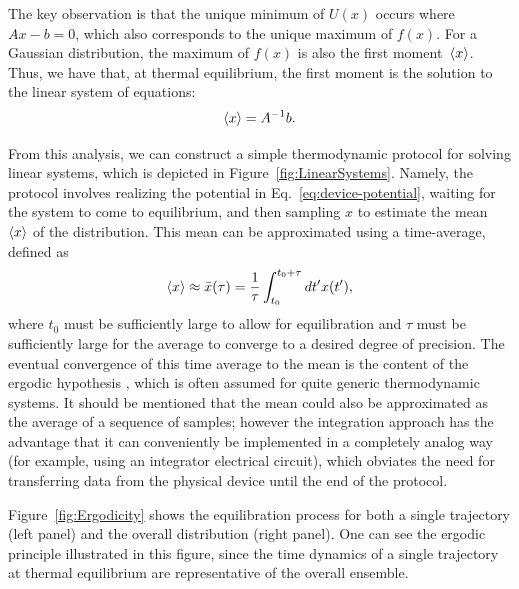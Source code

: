 \documentclass[prx,onecolumn,floatfix,longbibliography,notitlepage, nofootinbib,12pt]{revtex4-2}
\begin{document}
The key observation is that the unique minimum of $U(x)$ occurs where $Ax-b = 0$, which also corresponds to the unique maximum of $f(x)$. For a Gaussian distribution, the maximum of $f(x)$ is also the first moment~$\braket{x}$. Thus, we have that, at thermal equilibrium, the first moment is the solution to the linear system of equations:
\begin{equation}
    \label{eq:firstmoment}
    \braket{x} = A^{-1}b.
\end{equation}

From this analysis, we can construct a simple thermodynamic protocol for solving linear systems, which is depicted in Figure~\ref{fig:LinearSystems}. Namely, the protocol involves realizing the potential in Eq.~\eqref{eq:device-potential}, waiting for the system to come to equilibrium, and then sampling $x$ to estimate the mean $\braket{x}$ of the distribution. This mean can be approximated using a time-average, defined as
\begin{equation}
\label{eq:x-bar-def}
    \braket{x}\approx \bar{x}(\tau) = \frac{1}{\tau} \int_{t_0}^{t_0+\tau} dt' x(t'),
\end{equation}
where $t_0$ must be sufficiently large to allow for equilibration and $\tau$ must be sufficiently large for the average to converge to a desired degree of precision. The eventual convergence of this time average to the mean is the content of the ergodic hypothesis \cite{gallavotti1995ergodicity, sinai1963foundations}, which is often assumed for quite generic thermodynamic systems. It should be mentioned that the mean could also be approximated as the average of a sequence of samples; however the integration approach has the advantage that it can conveniently be implemented in a completely analog way (for example, using an integrator electrical circuit), which obviates the need for transferring data from the physical device until the end of the protocol. 

Figure~\ref{fig:Ergodicity} shows the equilibration process for both a single trajectory (left panel) and the overall distribution (right panel). One can see the ergodic principle illustrated in this figure, since the time dynamics of a single trajectory at thermal equilibrium are representative of the overall ensemble.
\end{document}

